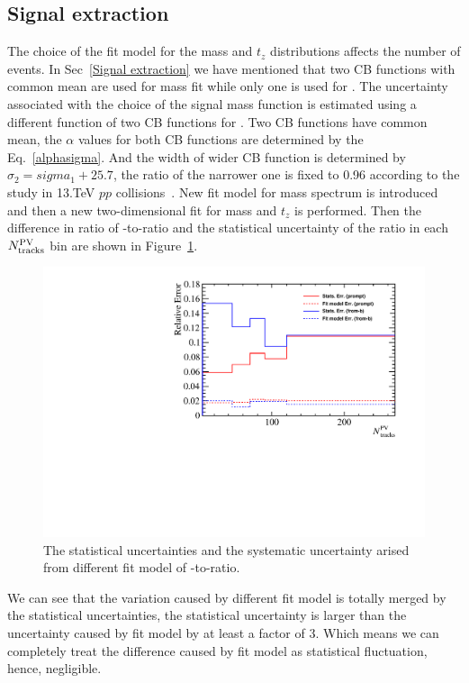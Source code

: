 \subsection{Signal extraction}
The choice of the fit model for the mass and $t_z$ distributions affects the number of events. In Sec~\ref{Signal extraction} we have mentioned that two CB functions with common mean are used for \jpsi mass fit while only one is used for \psitwos. The uncertainty associated with the choice of the signal mass function is estimated using a different function of two CB functions for \psitwos. Two CB functions have common mean, the $\alpha$ values for both CB functions are determined by the Eq.~\ref{alphasigma}. And the width of wider CB function is determined by $\sigma_2=sigma_1+25.7$, the ratio of the narrower one is fixed to 0.96 according to the study in 13.TeV $pp$ collisions~\cite{LHCb:2019eaj}.
New fit model for \psitwos mass spectrum is introduced and then a new two-dimensional fit for mass and $t_z$ is performed. Then the difference in ratio of \psitwos-to-\jpsi ratio and the statistical uncertainty of the ratio in each $N_{\rm tracks}^{\rm PV}$ bin are shown in Figure~\ref{StatsAndFit}.
\begin{figure}[H]
\begin{center}
\includegraphics[width=0.7\linewidth]{pdf/pPb/Workdir/SysErr/FitModel.pdf}
\end{center}
\caption{
        The statistical uncertainties and the systematic uncertainty arised from different fit model of \psitwos-to-\jpsi ratio.}
\label{StatsAndFit}
\end{figure}
We can see that the variation caused by different fit model is totally merged by the statistical uncertainties, the statistical uncertainty is larger than the uncertainty caused by fit model by at least a factor of 3. Which means we can completely treat the difference caused by fit model as statistical fluctuation, hence, negligible.

